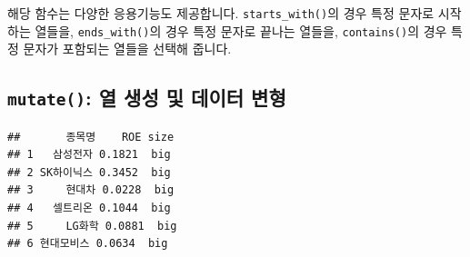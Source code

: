 \documentclass[12pt,]{book}
\newenvironment{Shaded}{\begin{snugshade}}{\end{snugshade}}
\newcommand{\DataTypeTok}[1]{\textcolor[rgb]{0.13,0.29,0.53}{#1}}
\newcommand{\DecValTok}[1]{\textcolor[rgb]{0.00,0.00,0.81}{#1}}
\newcommand{\KeywordTok}[1]{\textcolor[rgb]{0.13,0.29,0.53}{\textbf{#1}}}
\newcommand{\NormalTok}[1]{#1}
\newcommand{\OperatorTok}[1]{\textcolor[rgb]{0.81,0.36,0.00}{\textbf{#1}}}
\newcommand{\OtherTok}[1]{\textcolor[rgb]{0.56,0.35,0.01}{#1}}
\newcommand{\StringTok}[1]{\textcolor[rgb]{0.31,0.60,0.02}{#1}}
\begin{document}
해당 함수는 다양한 응용기능도 제공합니다. \texttt{starts\_with()}의 경우 특정 문자로 시작하는 열들을, \texttt{ends\_with()}의 경우 특정 문자로 끝나는 열들을, \texttt{contains()}의 경우 특정 문자가 포함되는 열들을 선택해 줍니다.

\hypertarget{mutate-----}{%
\subsection{\texorpdfstring{\texttt{mutate()}: 열 생성 및 데이터 변형}{mutate(): 열 생성 및 데이터 변형}}\label{mutate-----}}

\begin{Shaded}
\end{Shaded}

\begin{verbatim}
##       종목명    ROE size
## 1   삼성전자 0.1821  big
## 2 SK하이닉스 0.3452  big
## 3     현대차 0.0228  big
## 4   셀트리온 0.1044  big
## 5     LG화학 0.0881  big
## 6 현대모비스 0.0634  big
\end{verbatim}
\end{document}
